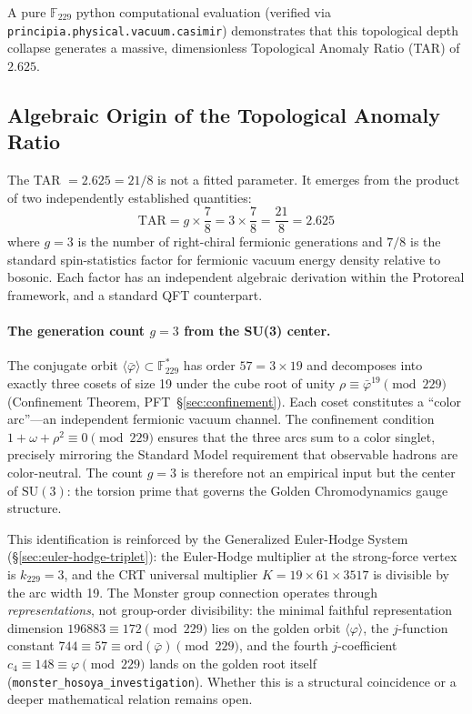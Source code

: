 A pure $\mathbb{F}_{229}$ python computational evaluation (verified via \texttt{principia.physical.vacuum.casimir}) demonstrates that this topological depth collapse generates a massive, dimensionless Topological Anomaly Ratio (TAR) of $2.625$.

\subsection{Algebraic Origin of the Topological Anomaly Ratio}\label{sec:tar_origin}

The TAR $= 2.625 = 21/8$ is not a fitted parameter. It emerges from the product of two independently established quantities:
\begin{equation}\label{eq:tar_decomposition}
    \mathrm{TAR} = g \times \frac{7}{8} = 3 \times \frac{7}{8} = \frac{21}{8} = 2.625
\end{equation}
where $g = 3$ is the number of right-chiral fermionic generations and $7/8$ is the standard spin-statistics factor for fermionic vacuum energy density relative to bosonic. Each factor has an independent algebraic derivation within the Protoreal framework, and a standard QFT counterpart.

\paragraph{The generation count $g = 3$ from the SU(3) center.}
The conjugate orbit $\langle\bar\varphi\rangle \subset \mathbb{F}_{229}^*$ has order $57 = 3 \times 19$ and decomposes into exactly three cosets of size 19 under the cube root of unity $\rho \equiv \bar\varphi^{19} \pmod{229}$ (Confinement Theorem, PFT~\S\ref{sec:confinement}). Each coset constitutes a ``color arc''---an independent fermionic vacuum channel. The confinement condition $1 + \omega + \rho^2 \equiv 0 \pmod{229}$ ensures that the three arcs sum to a color singlet, precisely mirroring the Standard Model requirement that observable hadrons are color-neutral. The count $g = 3$ is therefore not an empirical input but the center of $\mathrm{SU}(3)$: the torsion prime that governs the Golden Chromodynamics gauge structure.

This identification is reinforced by the Generalized Euler-Hodge System (\S\ref{sec:euler-hodge-triplet}): the Euler-Hodge multiplier at the strong-force vertex is $k_{229} = 3$, and the CRT universal multiplier $K = 19 \times 61 \times 3517$ is divisible by the arc width 19. The Monster group connection operates through \emph{representations}, not group-order divisibility: the minimal faithful representation dimension $196883 \equiv 172 \pmod{229}$ lies on the golden orbit $\langle\varphi\rangle$, the $j$-function constant $744 \equiv 57 \equiv \mathrm{ord}(\bar\varphi) \pmod{229}$, and the fourth $j$-coefficient $c_4 \equiv 148 \equiv \varphi \pmod{229}$ lands on the golden root itself (\texttt{monster\_hosoya\_investigation}). Whether this is a structural coincidence or a deeper mathematical relation remains open.

